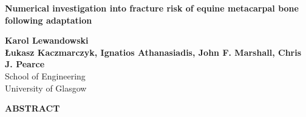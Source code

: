 \documentclass[11pt]{acmeArticle}
\numberwithin{equation}{section}
\begin{document}

\vspace*{-1mm}
\thispagestyle{fancy} 
\cfoot{}


\begin{center}
	
	{\fontsize{14}{20}\bf Numerical investigation into fracture risk of equine metacarpal bone following adaptation}\end{center}


\begin{center}
	\textbf{Karol Lewandowski }\\
	\textbf{{\L}ukasz Kaczmarczyk, Ignatios Athanasiadis, John F. Marshall, Chris J. Pearce }\\
	{School of Engineering} \\
	{University of Glasgow}
\end{center}
%
{\clearpage}

\begin{center}
	\textbf{ABSTRACT}\\[1mm]
\end{center}
%
\end{document}
